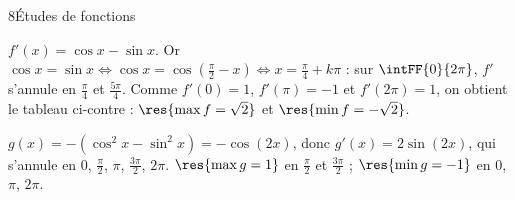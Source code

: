 \begin{corrige}{8}{Études de fonctions}
\noindent
\begin{minipage}[t]{0.52\linewidth}\vspace{0pt}\raggedright
\begin{questions}
  \item $f'(x)=\cos x-\sin x$. Or $\cos x=\sin x\iff\cos x=\cos\left(\frac{\pi}{2}-x\right)\iff x=\frac{\pi}{4}+k\pi$ : sur
    $\intFF{0}{2\pi}$, $f'$ s'annule en $\frac{\pi}{4}$ et $\frac{5\pi}{4}$. Comme $f'(0)=1$, $f'(\pi)=-1$ et $f'(2\pi)=1$, on
    obtient le tableau ci-contre : $\res{\max f=\sqrt2}$ et $\res{\min f=-\sqrt2}$.
\end{questions}
\end{minipage}\hfill
\begin{minipage}[t]{0.44\linewidth}\vspace{1mm}
\centering
\begin{tableau}
\end{tableau}
\end{minipage}

\noindent
\begin{minipage}[t]{0.42\linewidth}\vspace{0pt}\raggedright
\begin{questions}[start=2]
  \item $g(x)=-\left(\cos^{2}x-\sin^{2}x\right)=-\cos(2x)$, donc $g'(x)=2\sin(2x)$, qui s'annule en $0$, $\frac{\pi}{2}$, $\pi$,
    $\frac{3\pi}{2}$, $2\pi$. $\res{\max g=1}$ en $\frac{\pi}{2}$ et $\frac{3\pi}{2}$ ; $\res{\min g=-1}$ en $0$, $\pi$, $2\pi$.
\end{questions}
\end{minipage}\hfill
\begin{minipage}[t]{0.54\linewidth}\vspace{1mm}
\centering
\begin{tableau}
\end{tableau}
\end{minipage}


\end{corrige}
